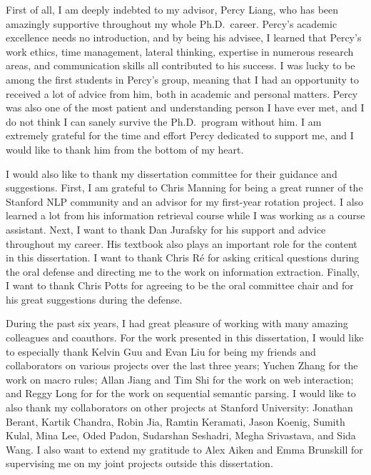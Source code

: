 
First of all, I am deeply indebted to my advisor,
Percy Liang,
who has been amazingly supportive throughout my whole Ph.D.\ career.
Percy's academic excellence needs no introduction,
and by being his advisee,
I learned that Percy's work ethics,
time management,
lateral thinking,
expertise in numerous research areas,
and communication skills all contributed to his success.
I was lucky to be among the first students in Percy's group,
meaning that I had an opportunity to received a lot of advice from him,
both in academic and personal matters.
Percy was also one of the most patient and understanding person
I have ever met,
and I do not think I can sanely survive the Ph.D.\ program
without him.
I am extremely grateful for the time and effort Percy dedicated
to support me,
and I would like to thank him from the bottom of my heart.

I would also like to thank my dissertation committee
for their guidance and suggestions.
First, I am grateful to Chris Manning for
being a great runner of the Stanford NLP community
and an advisor for my first-year rotation project.
I also learned a lot from his information retrieval course
while I was working as a course assistant.
Next, I want to thank Dan Jurafsky for his
support and advice throughout my career.
His textbook also plays an important role
for the content in this dissertation.
I want to thank Chris R\'e for asking critical
questions during the oral defense
and directing me to the work on information extraction.
Finally, I want to thank Chris Potts
for agreeing to be the
oral committee chair
and for his great suggestions during the defense.

During the past six years,
I had great pleasure of working with
many amazing colleagues and coauthors.
For the work presented in this dissertation,
I would like to especially thank
Kelvin Guu and Evan Liu for being my friends and collaborators
on various projects over the last three years;
Yuchen Zhang for the work on macro rules;
Allan Jiang and Tim Shi for the work on web interaction;
and Reggy Long for for the work on sequential semantic parsing.
I would like to also thank my collaborators on other projects
at Stanford University:
Jonathan Berant,
Kartik Chandra,
Robin Jia,
Ramtin Keramati,
Jason Koenig,
Sumith Kulal,
Mina Lee,
Oded Padon,
Sudarshan Seshadri,
Megha Srivastava, and
Sida Wang.
I also want to extend my gratitude to Alex Aiken and Emma Brunskill
for supervising me on my joint projects outside this dissertation.

